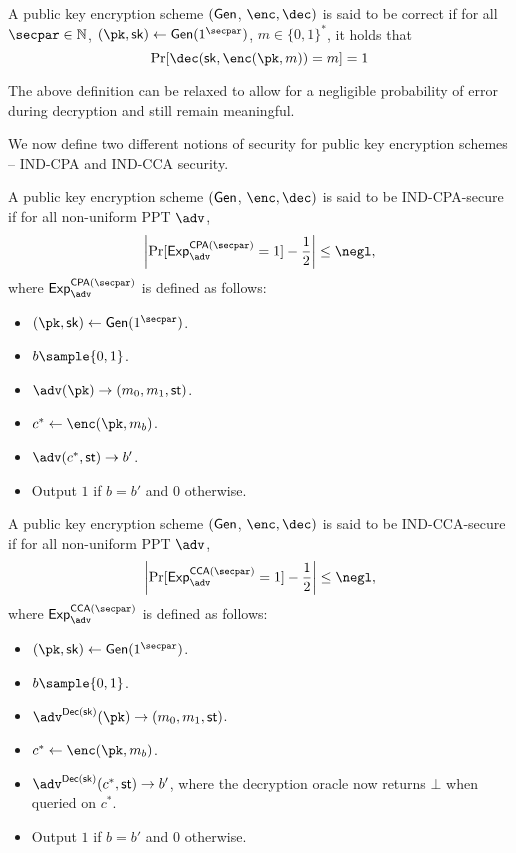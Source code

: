 \begin{definition}
    A public key encryption scheme $(\mathsf{Gen}$, $\enc, \dec)$ is said to be correct if for all $\secpar \in \mathbb{N}$, $(\pk, \sk) \gets \gen(1^\secpar)$, $m \in \{0,1\}^*$, it holds that
    \[\Pr[\dec(\sk, \enc(\pk, m)) = m] = 1\]
\end{definition}
The above definition can be relaxed to allow for a negligible probability of error during decryption and still remain meaningful.

We now define two different notions of security for public key encryption schemes -- IND-CPA and IND-CCA security.
\begin{definition}
    A public key encryption scheme $(\mathsf{Gen}$, $\enc, \dec)$ is said to be IND-CPA-secure if for all non-uniform PPT $\adv$,
    \[\left|\Pr[\mathsf{Exp}_{\adv}^{\mathsf{CPA}(\secpar)} = 1] - \frac{1}{2}\right| \leq \negl,\]
    where $\mathsf{Exp}_{\adv}^{\mathsf{CPA}(\secpar)}$ is defined as follows:
    \begin{itemize}
        \item $(\pk, \sk) \gets \gen(1^\secpar)$.
        \item $b \sample \{0,1\}$.
        \item $\adv(\pk) \to (m_0, m_1, \mathsf{st})$.
        \item $c^* \gets \enc(\pk, m_b)$.
        \item $\adv(c^*, \mathsf{st}) \to b'$.
        \item Output $1$ if $b = b'$ and $0$ otherwise.
    \end{itemize}
\end{definition}

\begin{definition}
    A public key encryption scheme $(\mathsf{Gen}$, $\enc, \dec)$ is said to be IND-CCA-secure if for all non-uniform PPT $\adv$,
    \[\left|\Pr[\mathsf{Exp}_{\adv}^{\mathsf{CCA}(\secpar)} = 1] - \frac{1}{2}\right| \leq \negl,\]
    where $\mathsf{Exp}_{\adv}^{\mathsf{CCA}(\secpar)}$ is defined as follows:
    \begin{itemize}
        \item $(\pk, \sk) \gets \gen(1^\secpar)$.
        \item $b \sample \{0,1\}$.
        \item $\adv^{\Dec(\sk)}(\pk) \to (m_0, m_1, \mathsf{st})$.
        \item $c^* \gets \enc(\pk, m_b)$.
        \item $\adv^{\Dec(\sk)}(c^*, \mathsf{st}) \to b'$, where the decryption oracle now returns $\bot$ when queried on $c^*$.
        \item Output $1$ if $b = b'$ and $0$ otherwise.
    \end{itemize}
\end{definition}

